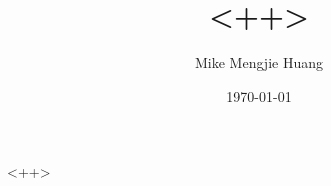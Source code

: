 \documentclass[xcolor=x11names,table]{beamer}
\title[<++>]
{<++>}
\author{Mike Mengjie Huang}
\institute[<++>]{<++>}
\date{\today}
\begin{document}
\begin{frame}
\titlepage
\end{frame}

\begin{frame}{<++>}
\tableofcontents
\end{frame}
\end{document}
